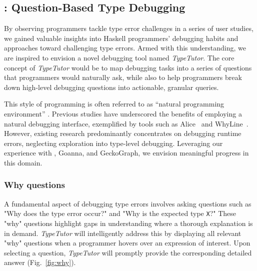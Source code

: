\subsection*{\typetutor: Question-Based Type Debugging}

By observing programmers tackle type error challenges in a series of user studies, we gained valuable insights into Haskell programmers' debugging habits and approaches toward challenging type errors. Armed with this understanding, we are inspired to envision a novel debugging tool named \textit{TypeTutor}. The core concept of \textit{TypeTutor} would be to map debugging tasks into a series of questions that programmers would naturally ask, while also to help programmers break down high-level debugging questions into actionable, granular queries.

This style of programming is often referred to as ``natural programming environment'' \cite{Myers2004-fy}. Previous studies have underscored the benefits of employing a natural debugging interface, exemplified by tools such as Alice~\cite{Conway2000-nn} and WhyLine~\cite{Ko2009-uf}. However, existing research predominantly concentrates on debugging runtime errors, neglecting exploration into type-level debugging.  Leveraging our experience with \chameleon{}, Goanna, and GeckoGraph, we envision meaningful progress in this domain.


\subsubsection*{Why questions}

A fundamental aspect of debugging type errors involves asking questions such as "Why does the type error occur?" and "Why is the expected type \texttt{X}?" These "why" questions highlight gaps in understanding where a thorough explanation is in demand. \textit{TypeTutor} will intelligently address this by displaying all relevant "why" questions when a programmer hovers over an expression of interest. Upon selecting a question, \textit{TypeTutor} will promptly provide the corresponding detailed answer (Fig.~\ref{fig:why}).



